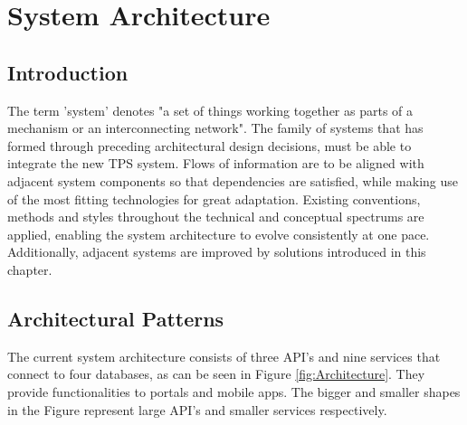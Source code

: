 \graphicspath{{Chapter3/Figs/Vector/}{Chapter3/Figs/}}

%
\chapter{System Architecture}
\section{Introduction}
The term 'system' denotes "a set of things working together as parts of a mechanism or an interconnecting network". The family of systems that has formed through preceding architectural design decisions, must be able to integrate the new TPS system. Flows of information are to be aligned with adjacent system components so that dependencies are satisfied, while making use of the most fitting technologies for great adaptation. Existing conventions, methods and styles throughout the technical and conceptual spectrums are applied, enabling the system architecture to evolve consistently at one pace. Additionally, adjacent systems are improved by solutions introduced in this chapter.

%
\section{Architectural Patterns}
The current system architecture consists of three API's and nine services that connect to four databases, as can be seen in Figure \ref{fig:Architecture}. They provide functionalities to portals and mobile apps. The bigger and smaller shapes in the Figure represent large API's and smaller services respectively.

